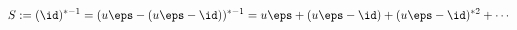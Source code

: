 \begin{equation}
S := (\id)^{*-1} = (u \eps -(u \eps -\id))^{*-1}
      = u \eps + (u \eps -\id) + (u \eps -\id)^{*2}
      + \cdots
\label{eq:geom-series}%
\end{equation}

